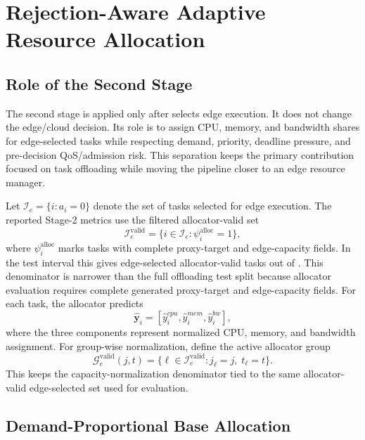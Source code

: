 \section{Rejection-Aware Adaptive Resource Allocation}
\label{sec:stage2_allocator}

\subsection{Role of the Second Stage}

The second stage is applied only after \fedddqn{} selects edge execution. It does not change the edge/cloud decision. Its role is to assign CPU, memory, and bandwidth shares for edge-selected tasks while respecting demand, priority, deadline pressure, and pre-decision QoS/admission risk. This separation keeps the primary contribution focused on task offloading while moving the pipeline closer to an edge resource manager.

Let $\mathcal{I}_e=\{i:a_i=0\}$ denote the set of tasks selected for edge execution. The reported Stage-2 metrics use the filtered allocator-valid set
\[
\mathcal{I}^{\mathrm{valid}}_e=
\{i\in\mathcal{I}_e:\psi_i^{\mathrm{alloc}}=1\},
\]
where $\psi_i^{\mathrm{alloc}}$ marks tasks with complete proxy-target and edge-capacity fields. In the test interval this gives \StageTwoEdgeTasks{} edge-selected allocator-valid tasks out of \StageTwoValidTasks{} \StageTwoFilterRule. This denominator is narrower than the full offloading test split because allocator evaluation requires complete generated proxy-target and edge-capacity fields. For each task, the allocator predicts
\begin{equation}
\hat{\mathbf{y}}_i=\left[\hat{y}^{cpu}_i,\hat{y}^{mem}_i,\hat{y}^{bw}_i\right],
\label{eq:alloc_vector}
\end{equation}
where the three components represent normalized CPU, memory, and bandwidth assignment.
For group-wise normalization, define the active allocator group
\begin{equation}
\mathcal{G}^{\mathrm{valid}}_e(j,t)=
\{\ell\in\mathcal{I}^{\mathrm{valid}}_e:j_\ell=j,\;t_\ell=t\}.
\label{eq:valid_allocator_group}
\end{equation}
This keeps the capacity-normalization denominator tied to the same allocator-valid edge-selected set used for evaluation.

\subsection{Demand-Proportional Base Allocation}

